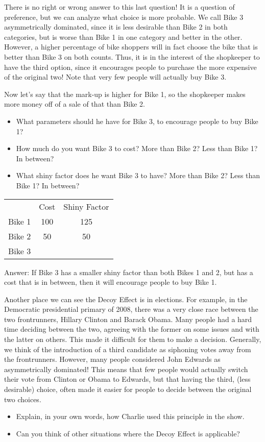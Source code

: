 There is no right or wrong answer to this last question! It is a question of preference, but we can analyze what choice is more probable. We call Bike 3 asymmetrically dominated, since it is less desirable than Bike 2 in both categories, but is worse than Bike 1 in one category and better in the other. However, a higher percentage of bike shoppers will in fact choose the bike that is better than Bike 3 on both counts. Thus, it is in the interest of the shopkeeper to have the third option, since it encourages people to purchase the more expensive of the original two! Note that very few people will actually buy Bike 3.


Now let’s say that the mark-up is higher for Bike 1, so the shopkeeper makes more money off of a sale of that than Bike 2.


\begin{itemize}
\item What parameters should he have for Bike 3, to encourage people to buy Bike 1?
\item How much do you want Bike 3 to cost? More than Bike 2? Less than Bike 1? In between?
\item What shiny factor does he want Bike 3 to have? More than Bike 2? Less than Bike 1? In between?
\end{itemize}


        \begin{table}[H]
        \centering
        \begin{tabular}{lcc}
        	& Cost	& Shiny Factor	\\ \cline{2-3} 
        \multicolumn{1}{r|}{Bike 1} & \multicolumn{1}{c|}{100}  & \multicolumn{1}{c|}{125} \\ \cline{2-3} 
        \multicolumn{1}{r|}{Bike 2} & \multicolumn{1}{c|}{50} & \multicolumn{1}{c|}{50}  \\ \cline{2-3} 
        \multicolumn{1}{l|}{Bike 3} & \multicolumn{1}{c|}{}  & \multicolumn{1}{c|}{} \\ \cline{2-3} 
        \end{tabular}
        \end{table}


\noindent Answer: If Bike 3 has a smaller shiny factor than both Bikes 1 and 2, but has a cost that is in between, then it will encourage people to buy Bike 1.


Another place we can see the Decoy Effect is in elections. For example, in the Democratic presidential primary of 2008, there was a very close race between the two frontrunners, Hillary Clinton and Barack Obama. Many people had a hard time deciding between the two, agreeing with the former on some issues and with the latter on others. This made it difficult for them to make a decision. Generally, we think of the introduction of a third candidate as siphoning votes away from the frontrunners. However, many people considered John Edwards as asymmetrically dominated! This means that few people would actually switch their vote from Clinton or Obama to Edwards, but that having the third, (less desirable) choice, often made it easier for people to decide between the original two choices.


\begin{itemize}
\item Explain, in your own words, how Charlie used this principle in the show.
\item Can you think of other situations where the Decoy Effect is applicable?
\end{itemize}